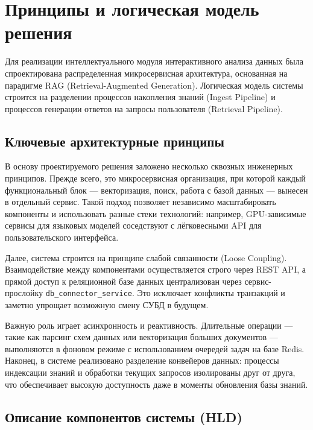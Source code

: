 \section{Принципы и логическая модель решения}

Для реализации интеллектуального модуля интерактивного анализа данных была спроектирована распределенная микросервисная архитектура, основанная на парадигме RAG (Retrieval-Augmented Generation). Логическая модель системы строится на разделении процессов накопления знаний (Ingest Pipeline) и процессов генерации ответов на запросы пользователя (Retrieval Pipeline).

\subsection{Ключевые архитектурные принципы}

В основу проектируемого решения заложено несколько сквозных инженерных принципов. Прежде всего, это микросервисная организация, при которой каждый функциональный блок — векторизация, поиск, работа с базой данных — вынесен в отдельный сервис. Такой подход позволяет независимо масштабировать компоненты и использовать разные стеки технологий: например, GPU-зависимые сервисы для языковых моделей соседствуют с лёгковесными API для пользовательского интерфейса.

Далее, система строится на принципе слабой связанности (Loose Coupling). Взаимодействие между компонентами осуществляется строго через REST API, а прямой доступ к реляционной базе данных централизован через сервис-прослойку \texttt{db\_connector\_service}. Это исключает конфликты транзакций и заметно упрощает возможную смену СУБД в будущем.

Важную роль играет асинхронность и реактивность. Длительные операции — такие как парсинг схем данных или векторизация больших документов — выполняются в фоновом режиме с использованием очередей задач на базе Redis. Наконец, в системе реализовано разделение конвейеров данных: процессы индексации знаний и обработки текущих запросов изолированы друг от друга, что обеспечивает высокую доступность даже в моменты обновления базы знаний.

\subsection{Описание компонентов системы (HLD)}

